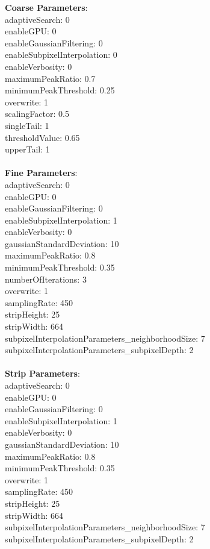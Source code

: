 \documentclass[11pt]{article}
\begin{document}
\textbf{Coarse Parameters}: \\
adaptiveSearch: 0\\
enableGPU: 0\\
enableGaussianFiltering: 0\\
enableSubpixelInterpolation: 0\\
enableVerbosity: 0\\
maximumPeakRatio: 0.7\\
minimumPeakThreshold: 0.25\\
overwrite: 1\\
scalingFactor: 0.5\\
singleTail: 1\\
thresholdValue: 0.65\\
upperTail: 1\\
\\
\textbf{Fine Parameters}: \\
adaptiveSearch: 0\\
enableGPU: 0\\
enableGaussianFiltering: 0\\
enableSubpixelInterpolation: 1\\
enableVerbosity: 0\\
gaussianStandardDeviation: 10\\
maximumPeakRatio: 0.8\\
minimumPeakThreshold: 0.35\\
numberOfIterations: 3\\
overwrite: 1\\
samplingRate: 450\\
stripHeight: 25\\
stripWidth: 664\\
subpixelInterpolationParameters\_neighborhoodSize: 7\\
subpixelInterpolationParameters\_subpixelDepth: 2\\
\\
\textbf{Strip Parameters}: \\
adaptiveSearch: 0\\
enableGPU: 0\\
enableGaussianFiltering: 0\\
enableSubpixelInterpolation: 1\\
enableVerbosity: 0\\
gaussianStandardDeviation: 10\\
maximumPeakRatio: 0.8\\
minimumPeakThreshold: 0.35\\
overwrite: 1\\
samplingRate: 450\\
stripHeight: 25\\
stripWidth: 664\\
subpixelInterpolationParameters\_neighborhoodSize: 7\\
subpixelInterpolationParameters\_subpixelDepth: 2\\
\\
\newpage
\end{document}
